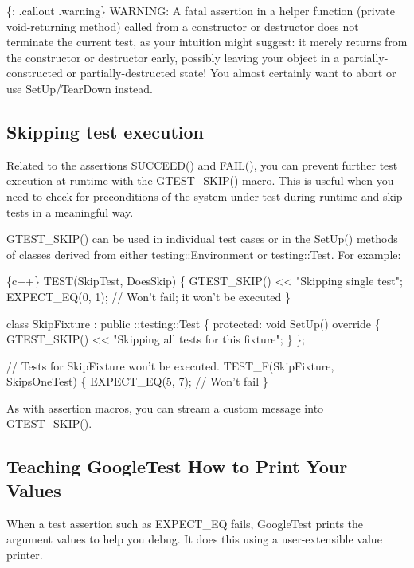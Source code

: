 \{\+: .callout .warning\} W\+A\+R\+N\+I\+NG\+: A fatal assertion in a helper function (private void-\/returning method) called from a constructor or destructor does not terminate the current test, as your intuition might suggest\+: it merely returns from the constructor or destructor early, possibly leaving your object in a partially-\/constructed or partially-\/destructed state! You almost certainly want to {\ttfamily abort} or use {\ttfamily Set\+Up}/{\ttfamily Tear\+Down} instead.

\subsection*{Skipping test execution}

Related to the assertions {\ttfamily S\+U\+C\+C\+E\+E\+D()} and {\ttfamily F\+A\+I\+L()}, you can prevent further test execution at runtime with the {\ttfamily G\+T\+E\+S\+T\+\_\+\+S\+K\+I\+P()} macro. This is useful when you need to check for preconditions of the system under test during runtime and skip tests in a meaningful way.

{\ttfamily G\+T\+E\+S\+T\+\_\+\+S\+K\+I\+P()} can be used in individual test cases or in the {\ttfamily Set\+Up()} methods of classes derived from either {\ttfamily \mbox{\hyperlink{classtesting_1_1Environment}{testing\+::\+Environment}}} or {\ttfamily \mbox{\hyperlink{classtesting_1_1Test}{testing\+::\+Test}}}. For example\+:


\begin{DoxyCode}
\{c++\}
TEST(SkipTest, DoesSkip) \{
  GTEST\_SKIP() << "Skipping single test";
  EXPECT\_EQ(0, 1);  // Won't fail; it won't be executed
\}

class SkipFixture : public ::testing::Test \{
 protected:
  void SetUp() override \{
    GTEST\_SKIP() << "Skipping all tests for this fixture";
  \}
\};

// Tests for SkipFixture won't be executed.
TEST\_F(SkipFixture, SkipsOneTest) \{
  EXPECT\_EQ(5, 7);  // Won't fail
\}
\end{DoxyCode}


As with assertion macros, you can stream a custom message into {\ttfamily G\+T\+E\+S\+T\+\_\+\+S\+K\+I\+P()}.

\subsection*{Teaching Google\+Test How to Print Your Values}

When a test assertion such as {\ttfamily E\+X\+P\+E\+C\+T\+\_\+\+EQ} fails, Google\+Test prints the argument values to help you debug. It does this using a user-\/extensible value printer.

